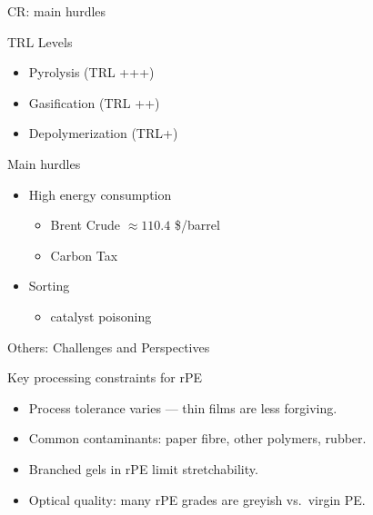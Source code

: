 \begin{frame}{CR:  main hurdles}
    \begin{greenblock}{TRL Levels}
        \begin{itemize}
            \item Pyrolysis (TRL +++) \cite{fraczak_chemical_2021}
            \item Gasification (TRL ++) \cite{fraczak_chemical_2021}
            \item Depolymerization (TRL+) \cite{garland2024catalytic}
        \end{itemize}
    \end{greenblock}
    \begin{block}{Main hurdles}
        \begin{itemize}
            \item High energy consumption 
            \begin{itemize}
                \item Brent Crude $\approx 110.4$ \$/barrel
                \item Carbon Tax 
            \end{itemize}
            \item Sorting
            \begin{itemize}
                \item catalyst poisoning  
            \end{itemize}  
        \end{itemize}
    \end{block}
     
\end{frame}

\begin{frame}{Others: Challenges and Perspectives}
    \begin{block}{Key processing constraints for rPE}
        \begin{itemize}
            \item Process tolerance varies --- thin films are less forgiving.
            \item Common contaminants: paper fibre, other polymers, rubber.
            \item Branched gels in rPE limit stretchability.
            \item Optical quality: many rPE grades are greyish vs.\ virgin PE.
        \end{itemize}
    \end{block}
\end{frame}

